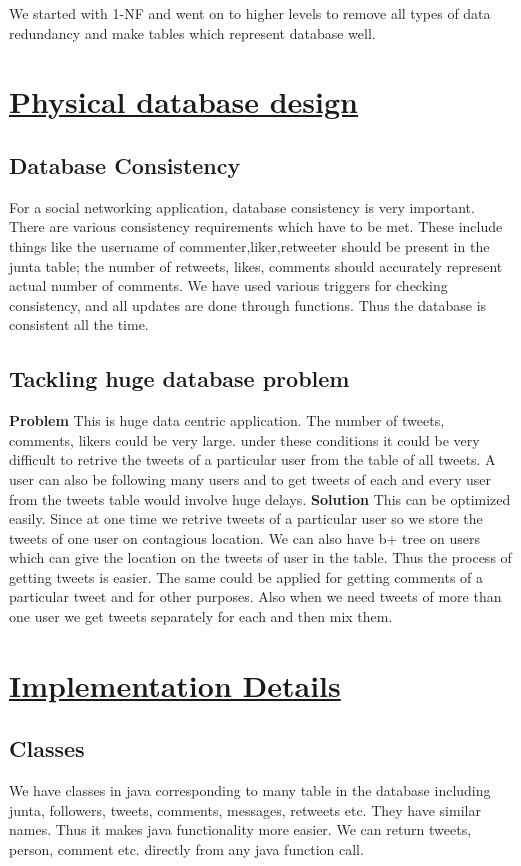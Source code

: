 \documentclass[a4paper]{article}
\begin{document}
We started with 1-NF and went on to higher levels to remove all types of data redundancy and make tables which represent database well.

\section*{{\underline{Physical database design}}}
\vspace{1cm}
\subsection*{Database Consistency}
For a social networking application, database consistency is very important. There are various consistency requirements which have to be met. These include things like the username of commenter,liker,retweeter should be present in the junta table; the number of retweets, likes, comments should accurately represent actual number of comments. We have used various triggers for checking consistency, and all updates are done through functions. Thus the database is consistent all the time.

\subsection*{Tackling huge database problem}

\textbf{Problem} This is huge data centric application. The number of tweets, comments, likers could be very large. under these conditions it could be very difficult to retrive the tweets of a particular user from the table of all tweets. A user can also be following many users and to get tweets of each and every user from the tweets table would involve huge delays.
\textbf{Solution} This can be optimized easily. Since at one time we retrive tweets of a particular user so we store the tweets of one user on contagious location. We can also have b+ tree on users which can give the location on the tweets of user in the table. Thus the process of getting tweets is easier. The same could be applied for getting comments of a particular tweet and for other purposes. Also when we need tweets of more than one user we get tweets separately for each and then mix them.
\section*{{\underline{Implementation Details}}}
\vspace{1cm}
\subsection*{Classes}
We have classes in java corresponding to many table in the database including junta, followers, tweets, comments, messages, retweets etc. They have similar names. Thus it makes java functionality more easier. We can return tweets, person, comment etc. directly from any java function call.
\end{document}
